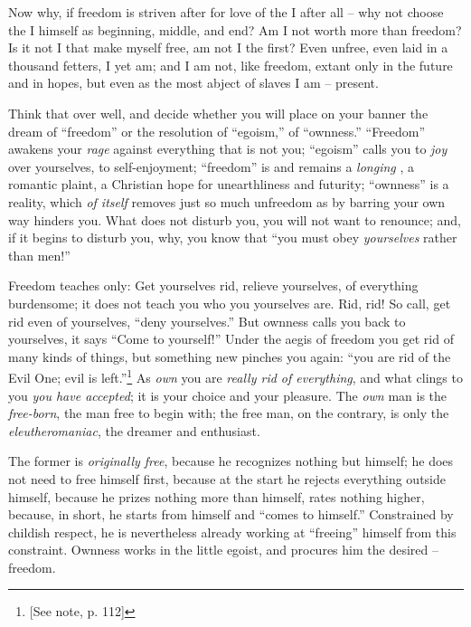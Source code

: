\documentclass[12pt,a4paper]{book}
\begin{document}
Now why, if freedom is striven after for love of the I after all -- why not 
choose the I himself as beginning, middle, and end? Am I not worth more than 
freedom? Is it not I that make myself free, am not I the first? Even unfree, 
even laid in a thousand fetters, I yet am; and I am not, like freedom, extant 
only in the future and in hopes, but even as the most abject of slaves I am -- 
present.

Think that over well, and decide whether you will place on your banner the 
dream of ``freedom'' or the resolution of ``egoism,'' of ``ownness.'' 
``Freedom'' awakens your \textit{rage} against everything that is not you; 
``egoism'' calls you to \textit{joy} over yourselves, to self-enjoyment; 
``freedom'' is and remains a \textit{longing} , a romantic plaint, a 
Christian hope for unearthliness and futurity; ``ownness'' is a reality, 
which \textit{of itself} removes just so much unfreedom as by barring your own 
way hinders you. What does not disturb you, you will not want to renounce; 
and, if it begins to disturb you, why, you know that ``you must obey 
\textit{yourselves} rather than men!''

Freedom teaches only: Get yourselves rid, relieve yourselves, of everything 
burdensome; it does not teach you who you yourselves are. Rid, rid! So call, 
get rid even of yourselves, ``deny yourselves.'' But ownness calls you back 
to yourselves, it says ``Come to yourself!'' Under the aegis of freedom you 
get rid of many kinds of things, but something new pinches you again: ``you 
are rid of the Evil One; evil is left.''\footnote{[See note, p. 112]} As 
\textit{own} you are \textit{really rid of everything}, and what clings to you 
\textit{you have accepted}; it is your choice and your pleasure. The 
\textit{own} man is the \textit{free-born}, the man free to begin with; the 
free man, on the contrary, is only the \textit{eleutheromaniac}, the dreamer 
and enthusiast.

The former is \textit{originally free}, because he recognizes nothing but 
himself; he does not need to free himself first, because at the start he 
rejects everything outside himself, because he prizes nothing more than 
himself, rates nothing higher, because, in short, he starts from himself and 
``comes to himself.'' Constrained by childish respect, he is nevertheless 
already working at ``freeing'' himself from this constraint. Ownness works 
in the little egoist, and procures him the desired -- freedom.
\end{document}

